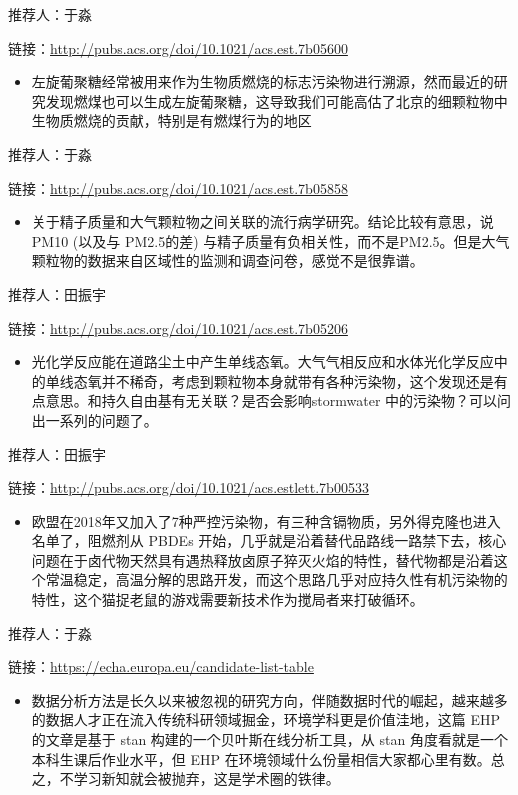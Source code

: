 \documentclass[]{book}
\providecommand{\tightlist}{%
  \setlength{\itemsep}{0pt}\setlength{\parskip}{0pt}}
\begin{document}
推荐人：于淼

链接：\url{http://pubs.acs.org/doi/10.1021/acs.est.7b05600}

\begin{itemize}
\tightlist
\item
  左旋葡聚糖经常被用来作为生物质燃烧的标志污染物进行溯源，然而最近的研究发现燃煤也可以生成左旋葡聚糖，这导致我们可能高估了北京的细颗粒物中生物质燃烧的贡献，特别是有燃煤行为的地区
\end{itemize}

推荐人：于淼

链接：\url{http://pubs.acs.org/doi/10.1021/acs.est.7b05858}

\begin{itemize}
\tightlist
\item
  关于精子质量和大气颗粒物之间关联的流行病学研究。结论比较有意思，说 PM10 (以及与 PM2.5的差) 与精子质量有负相关性，而不是PM2.5。但是大气颗粒物的数据来自区域性的监测和调查问卷，感觉不是很靠谱。
\end{itemize}

推荐人：田振宇

链接：\url{http://pubs.acs.org/doi/10.1021/acs.est.7b05206}

\begin{itemize}
\tightlist
\item
  光化学反应能在道路尘土中产生单线态氧。大气气相反应和水体光化学反应中的单线态氧并不稀奇，考虑到颗粒物本身就带有各种污染物，这个发现还是有点意思。和持久自由基有无关联？是否会影响stormwater 中的污染物？可以问出一系列的问题了。
\end{itemize}

推荐人：田振宇

链接：\url{http://pubs.acs.org/doi/10.1021/acs.estlett.7b00533}

\begin{itemize}
\tightlist
\item
  欧盟在2018年又加入了7种严控污染物，有三种含镉物质，另外得克隆也进入名单了，阻燃剂从 PBDEs 开始，几乎就是沿着替代品路线一路禁下去，核心问题在于卤代物天然具有遇热释放卤原子猝灭火焰的特性，替代物都是沿着这个常温稳定，高温分解的思路开发，而这个思路几乎对应持久性有机污染物的特性，这个猫捉老鼠的游戏需要新技术作为搅局者来打破循环。
\end{itemize}

推荐人：于淼

链接：\url{https://echa.europa.eu/candidate-list-table}

\begin{itemize}
\tightlist
\item
  数据分析方法是长久以来被忽视的研究方向，伴随数据时代的崛起，越来越多的数据人才正在流入传统科研领域掘金，环境学科更是价值洼地，这篇 EHP 的文章是基于 stan 构建的一个贝叶斯在线分析工具，从 stan 角度看就是一个本科生课后作业水平，但 EHP 在环境领域什么份量相信大家都心里有数。总之，不学习新知就会被抛弃，这是学术圈的铁律。
\end{itemize}
\end{document}
